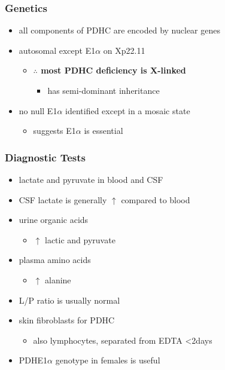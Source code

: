 \documentclass[12pt]{scrartcl}
\begin{document}
\subsubsection{Genetics}
\label{sec:orgb8c2efb}
\begin{itemize}
\item all components of PDHC are encoded by nuclear genes
\item autosomal except E1\(\alpha\) on Xp22.11
\begin{itemize}
\item \textbf{\(\therefore\) most PDHC deficiency is X-linked}
\begin{itemize}
\item has semi-dominant inheritance
\end{itemize}
\end{itemize}
\item no null E1\(\alpha\) identified except in a mosaic state
\begin{itemize}
\item suggests E1\(\alpha\) is essential
\end{itemize}
\end{itemize}

\subsubsection{Diagnostic Tests}
\label{sec:org90adf8e}
\begin{itemize}
\item lactate and pyruvate in blood and CSF
\item CSF lactate is generally \(\uparrow\) compared to blood
\item urine organic acids
\begin{itemize}
\item \(\uparrow\) lactic and pyruvate
\end{itemize}
\item plasma amino acids
\begin{itemize}
\item \(\uparrow\) alanine
\end{itemize}
\item L/P ratio is usually normal
\item skin fibroblasts for PDHC
\begin{itemize}
\item also lymphocytes, separated from EDTA <2days
\end{itemize}
\item PDHE1\(\alpha\) genotype in females is useful
\end{itemize}
\end{document}
